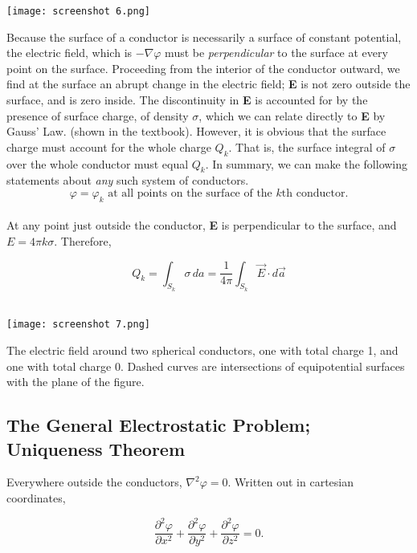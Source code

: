 \documentclass[svgnames]{article}
\begin{document}
\begin{center}
  \texttt{[image: screenshot 6.png]}
\end{center}

Because the surface of a conductor is necessarily a surface of constant
potential, the electric field, which is $-\nabla \varphi$ must be
\textit{perpendicular} to the surface at every point on the surface. Proceeding
from the interior of the conductor outward, we find at the surface an abrupt
change in the electric field;  \textbf{E} is not zero outside the surface, and
is zero inside. The discontinuity in \textbf{E} is accounted for by the
presence of surface charge, of density $\sigma$, which we can relate directly
to  \textbf{E} by Gauss' Law. (shown in the textbook). However, it is obvious
that the surface charge must account for the whole charge $Q_k$. That is, the
surface integral of $\sigma$ over the whole conductor must equal $Q_k$. In
summary, we can make the following statements about \textit{any} such system of
conductors. \\\[
\varphi = \varphi_k \text{ at all points on the surface of the $k$th conductor}
.\]\\ 

At any point just outside the conductor, \textbf{E} is perpendicular to the
surface, and $E = 4\pi k \sigma$. Therefore, 

\[
  Q_k = \int_{S_k} \sigma \, da = \frac{1}{4\pi} \int_{S_k} \vec{E} \cdot
  d\vec{a} 
\]\\
\begin{center}
\texttt{[image: screenshot 7.png]}
\end{center}

The electric field around two spherical conductors, one with total charge 1,
and one with total charge 0. Dashed curves are intersections of equipotential
surfaces with the plane of the figure. 

\subsection{The General Electrostatic Problem; Uniqueness Theorem}

Everywhere outside the conductors, $\nabla^2 \varphi = 0$. Written out in
cartesian coordinates, 

\[
\frac{\partial^2\varphi}{\partial x^2} + \frac{\partial^2\varphi}{\partial y^2}
+ \frac{\partial^2\varphi}{\partial z^2} = 0
.\] \\
\end{document}
